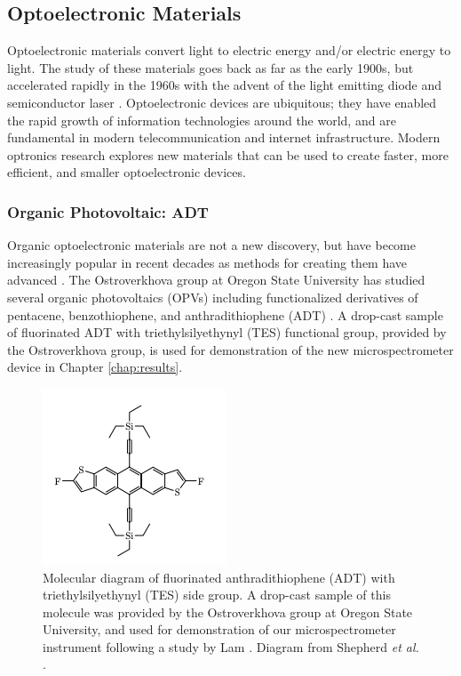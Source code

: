 \subsection{Optoelectronic Materials}\label{chap:intro-optomats}

Optoelectronic materials convert light to electric energy and/or electric energy to light. The study of these materials goes back as far as the early 1900s, but accelerated rapidly in the 1960s with the advent of the light emitting diode and semiconductor laser \cite{sweeney_optoelectronic_2017}. Optoelectronic devices are ubiquitous; they have enabled the rapid growth of information technologies around the world, and are fundamental in modern telecommunication and internet infrastructure. Modern optronics research explores new materials that can be used to create faster, more efficient, and smaller optoelectronic devices.

\subsubsection{Organic Photovoltaic: ADT}\label{chap:intro-optomats-adt}

Organic optoelectronic materials are not a new discovery, but have become increasingly popular in recent decades as methods for creating them have advanced \cite{ostroverkhova_organic_2016}. The Ostroverkhova group at Oregon State University has studied several organic photovoltaics (OPVs) including functionalized derivatives of pentacene, benzothiophene, and anthradithiophene (ADT) \cite{shepherd_optical_2010, e._b._shepherd_effect_2011, platt_optical_2009}. A drop-cast sample of fluorinated ADT with triethylsilyethynyl (TES) functional group, provided by the Ostroverkhova group, is used for demonstration of the new microspectrometer device in Chapter \ref{chap:results}.

\begin{figure}[H]
    \centering
    \includegraphics{img/adt-tes-f.png}
    \caption[Molecular diagram of ADT TES-F.]{Molecular diagram of fluorinated anthradithiophene (ADT) with triethylsilyethynyl (TES) side group. A drop-cast sample of this molecule was provided by the Ostroverkhova group at Oregon State University, and used for demonstration of our microspectrometer instrument following a study by Lam \cite{lam_polarization_2018}. Diagram from Shepherd \emph{et al.} \cite{shepherd_optical_2010}.}
    \label{fig:adt-diagram}
\end{figure}

